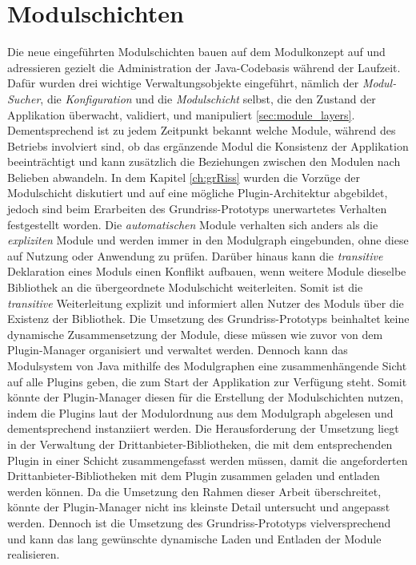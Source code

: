 \section{Modulschichten}
Die neue eingeführten Modulschichten bauen auf dem Modulkonzept auf und adressieren gezielt die Administration der Java-Codebasis während der Laufzeit. Dafür wurden drei wichtige Verwaltungsobjekte eingeführt, nämlich der \textit{Modul-Sucher}, die \textit{Konfiguration} und die \textit{Modulschicht} selbst, die den Zustand der Applikation überwacht, validiert, und manipuliert \ref{sec:module_layers}. Dementsprechend ist zu jedem Zeitpunkt bekannt welche Module, während des Betriebs involviert sind, ob das ergänzende Modul die Konsistenz der Applikation beeinträchtigt und kann zusätzlich die Beziehungen zwischen den Modulen nach Belieben abwandeln. In dem Kapitel \ref{ch:grRiss} wurden die Vorzüge der Modulschicht diskutiert und auf eine mögliche Plugin-Architektur abgebildet, jedoch sind beim Erarbeiten des Grundriss-Prototyps unerwartetes Verhalten festgestellt worden. Die \textit{automatischen} Module verhalten sich anders als die \textit{expliziten} Module und werden immer in den Modulgraph eingebunden, ohne diese auf Nutzung oder Anwendung zu prüfen. Darüber hinaus kann die \textit{transitive} Deklaration eines Moduls einen Konflikt aufbauen, wenn weitere Module dieselbe Bibliothek an die übergeordnete Modulschicht weiterleiten. Somit ist die \textit{transitive} Weiterleitung explizit und informiert allen Nutzer des Moduls über die Existenz der Bibliothek.\newline
Die Umsetzung des Grundriss-Prototyps beinhaltet keine dynamische Zusammensetzung der Module, diese müssen wie zuvor von dem Plugin-Manager organisiert und verwaltet werden. Dennoch kann das Modulsystem von Java mithilfe des Modulgraphen eine zusammenhängende Sicht auf alle Plugins geben, die zum Start der Applikation zur Verfügung steht. Somit könnte der Plugin-Manager diesen für die Erstellung der Modulschichten nutzen, indem die Plugins laut der Modulordnung aus dem Modulgraph abgelesen und dementsprechend instanziiert werden. Die Herausforderung der Umsetzung liegt in der Verwaltung der Drittanbieter-Bibliotheken, die mit dem entsprechenden Plugin in einer Schicht zusammengefasst werden müssen, damit die angeforderten Drittanbieter-Bibliotheken mit dem Plugin zusammen geladen und entladen werden können. Da die Umsetzung den Rahmen dieser Arbeit überschreitet, könnte der Plugin-Manager nicht ins kleinste Detail untersucht und angepasst werden. Dennoch ist die Umsetzung des Grundriss-Prototyps vielversprechend und kann das lang gewünschte dynamische Laden und Entladen der Module realisieren. \bigbreak

